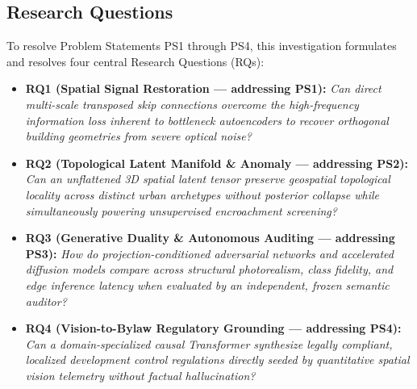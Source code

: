 \documentclass[journal]{IEEEtran}
\begin{document}
\subsection{Research Questions}
To resolve Problem Statements PS1 through PS4, this investigation formulates and resolves four central Research Questions (RQs):
\begin{itemize}
    \item \textbf{RQ1 (Spatial Signal Restoration --- addressing PS1):} \textit{Can direct multi-scale transposed skip connections overcome the high-frequency information loss inherent to bottleneck autoencoders to recover orthogonal building geometries from severe optical noise?}
    \item \textbf{RQ2 (Topological Latent Manifold \& Anomaly --- addressing PS2):} \textit{Can an unflattened 3D spatial latent tensor preserve geospatial topological locality across distinct urban archetypes without posterior collapse while simultaneously powering unsupervised encroachment screening?}
    \item \textbf{RQ3 (Generative Duality \& Autonomous Auditing --- addressing PS3):} \textit{How do projection-conditioned adversarial networks and accelerated diffusion models compare across structural photorealism, class fidelity, and edge inference latency when evaluated by an independent, frozen semantic auditor?}
    \item \textbf{RQ4 (Vision-to-Bylaw Regulatory Grounding --- addressing PS4):} \textit{Can a domain-specialized causal Transformer synthesize legally compliant, localized development control regulations directly seeded by quantitative spatial vision telemetry without factual hallucination?}
\end{itemize}
\end{document}
